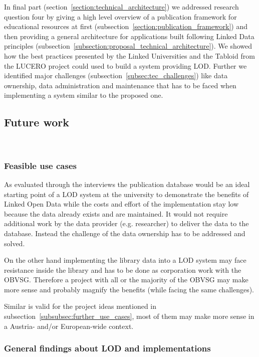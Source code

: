 In final part (section~\ref{section:technical_architecture}) we addressed research question four by giving a high level overview of a publication framework for educational resources at first (subsection~\ref{section:publication_framework}) and then providing a general architecture for applications built following Linked Data principles (subsection~\ref{subsection:proposal_technical_architecture}). We showed how the best practices presented by the Linked Universities and the Tabloid from the LUCERO project could used to build a system providing LOD. Further we identified major challenges (subsection~\ref{subsec:tec_challenges}) like data ownership, data administration and maintenance that has to be faced when implementing a system similar to the proposed one.

\subsection{Future work}~\label{subsection:future_work}

\subsubsection{Feasible use cases}

As evaluated through the interviews the publication database would be an ideal starting point of a LOD system at the university to demonstrate the benefits of Linked Open Data while the costs and effort of the implementation stay low because the data already exists and are maintained. It would not require additional work by the data provider (e.g. researcher) to deliver the data to the database. Instead the challenge of the data ownership has to be addressed and solved.

On the other hand implementing the library data into a LOD system may face resistance inside the library and has to be done as corporation work with the OBVSG. Therefore a project with all or the majority of the OBVSG may make more sense and probably magnify the benefits (while facing the same challenges).

Similar is valid for the project ideas mentioned in subsection~\ref{subsubsec:further_use_cases}, most of them may make more sense in a Austria- and/or European-wide context.

\subsubsection{General findings about LOD and implementations}

